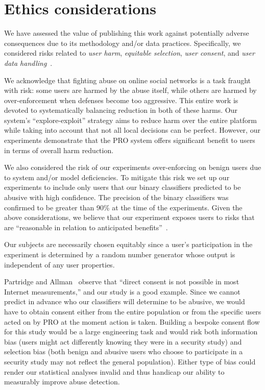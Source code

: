 \section{Ethics considerations}
\label{sec:ethics}

We have assessed the value of publishing this work against potentially adverse consequences due to its methodology and/or data practices. Specifically, we considered risks related to \emph{user harm}, \emph{equitable selection}, \emph{user consent}, and \emph{user data handling}~\cite{irb}.

We acknowledge that fighting abuse on online social networks is a task fraught with risk: some users are harmed by the abuse itself, while others are harmed by over-enforcement when defenses become too aggressive. This entire work is devoted to systematically balancing reduction in both of these harms. Our system's ``explore-exploit'' strategy aims to reduce harm over the entire platform while taking into account that not all local decisions can be perfect. However, our experiments demonstrate that the PRO system offers significant benefit to users in terms of overall harm reduction.

We also considered the risk of our experiments over-enforcing on benign users due to system and/or model deficiencies. To mitigate this risk we set up our experiments to include only users that our binary classifiers predicted to be abusive with high confidence. The precision of the binary classifiers was confirmed to be greater than 90\% at the time of the experiments. Given the above considerations, we believe that our experiment exposes users to risks that are ``reasonable in relation to anticipated benefits''~\cite{irb}. 

 Our subjects are necessarily chosen equitably since a user's participation in the experiment is determined by a random number generator whose output is independent of any user properties.

Partridge and Allman~\cite{partridge-allman} observe that ``direct
consent is not possible in most Internet measurements,'' and our study is a good example.
Since we cannot predict in advance who our classifiers will determine to be abusive, we would have to obtain consent either from the entire \osn population or from the specific users acted on by PRO at the moment action is taken. Building a bespoke consent flow for this study would be a large engineering task and would risk both information bias (users might act differently knowing they were in a security study) and selection bias (both benign and abusive users who choose to participate in a security study may not reflect the general population). Either type of bias could render our statistical analyses invalid and thus handicap our ability to measurably improve abuse detection.

